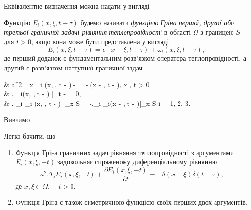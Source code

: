Еквівалентне визначення можна надати у вигляді
\begin{definition}
	Функцію $E_i (x, \xi, t - \tau)$ будемо називати \textit{функцією Гріна першої, другої або третьої граничної задачі рівняння теплопровідності} в області $\Omega$ з границею $S$ для $t > 0$, якщо вона може бути представлена у вигляді
	\begin{equation}
		E_i(x, \xi, t - \tau) = \epsilon(x - \xi, t - \tau) + \omega_i(x, \xi, t - \tau),
	\end{equation}
	де  перший доданок є фундаментальним розв'язком оператора теплопровідності, а другий  є розв'язком наступної граничної задачі
	\begin{system}
		& a^2 \Delta_x \omega_i (x, \xi, t - \tau) -  = - \delta(x - \xi, t - \tau), \quad x \in \Omega, \quad t > 0 \\
		& \left. \omega_i(x, \xi, t - \tau) \right|_{t - \tau {}} = 0, \\
		& \left. \ell_i \omega_i (x, \xi, t - \tau) \right|_{x \in S} = -\left.\ell_i \epsilon_i(x - \xi, t - \tau)\right|_{x \in S} \quad i = 1, 2, 3.
	\end{system}
\end{definition}

Вивчимо 
\begin{properties}
	Легко бачити, що 
	\begin{enumerate}
		\item Функція Гріна граничних задач рівняння теплопровідності з аргументами $E_i(x, \xi, -t)$ задовольняє спряженому диференціальному рівнянню
		\begin{equation}
			a^2 \Delta_x E_i(x, \xi, -t) + \frac{\partial E_i(x, \xi, - t)}{\partial t} = - \delta(x - \xi) \delta (t - \tau),
		\end{equation}
		де $x, \xi \in \Omega$, $\quad t > 0$.
		\item Функція Гріна є також симетричною функцією своїх перших двох аргументів.
	\end{enumerate}
\end{properties}
	
